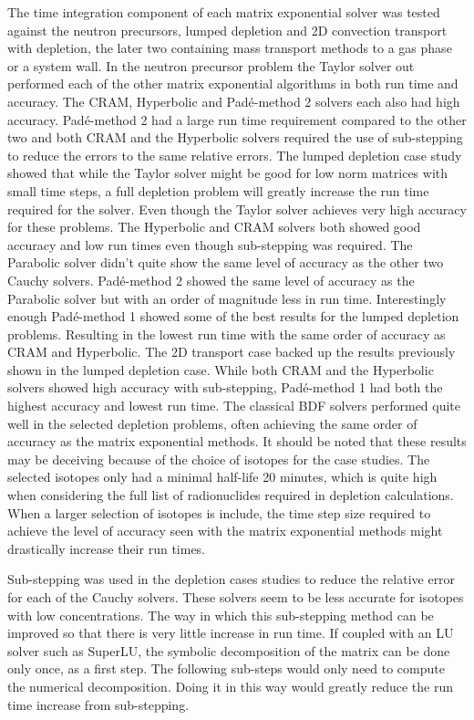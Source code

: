 The time integration component of each matrix exponential solver was tested against the neutron precursors, lumped depletion and 2D convection transport with depletion, the later two containing mass transport methods to a gas phase or a system wall. In the neutron precursor problem the Taylor solver out performed each of the other matrix exponential algorithms in both run time and accuracy. The CRAM, Hyperbolic and Pad\'e-method 2 solvers each also had high accuracy. Pad\'e-method 2 had a large run time requirement compared to the other two and both CRAM and the Hyperbolic solvers required the use of sub-stepping to reduce the errors to the same relative errors. The lumped depletion case study showed that while the Taylor solver might be good for low norm matrices with small time steps, a full depletion problem will greatly increase the run time required for the solver. Even though the Taylor solver achieves very high accuracy for these problems. The Hyperbolic and CRAM solvers both showed good accuracy and low run times even though sub-stepping was required. The Parabolic solver didn't quite show the same level of accuracy as the other two Cauchy solvers. Pad\'e-method 2 showed the same level of accuracy as the Parabolic solver but with an order of magnitude less in run time. Interestingly enough Pad\'e-method 1 showed some of the best results for the lumped depletion problems. Resulting in the lowest run time with the same order of accuracy as CRAM and Hyperbolic. The 2D transport case backed up the results previously shown in the lumped depletion case. While both CRAM and the Hyperbolic solvers showed high accuracy with sub-stepping, Pad\'e-method 1 had both the highest accuracy and lowest run time. The classical BDF solvers performed quite well in the selected depletion problems, often achieving the same order of accuracy as the matrix exponential methods. It should be noted that these results may be deceiving because of the choice of isotopes for the case studies. The selected isotopes only had a minimal half-life 20 minutes, which is quite high when considering the full list of radionuclides required in depletion calculations. When a larger selection of isotopes is include, the time step size required to achieve the level of accuracy seen with the matrix exponential methods might drastically increase their run times. 

Sub-stepping was used in the depletion cases studies to reduce the relative error for each of the Cauchy solvers. These solvers seem to be less accurate for isotopes with low concentrations. The way in which this sub-stepping method can be improved so that there is very little increase in run time. If coupled with an LU solver such as SuperLU, the symbolic decomposition of the matrix can be done only once, as a first step. The following sub-steps would only need to compute the numerical decomposition. Doing it in this way would greatly reduce the run time increase from sub-stepping. 

